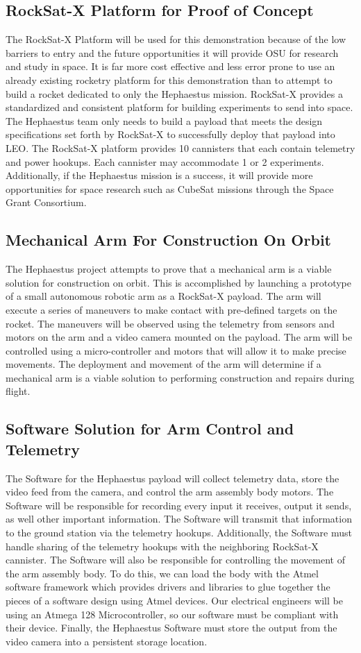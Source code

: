 \documentclass[letterpaper,10pt]{article}
\begin{document}
\subsection{RockSat-X Platform for Proof of Concept}
The RockSat-X Platform will be used for this demonstration because of the low barriers to entry and
the future opportunities it will provide OSU for research and study in space.
It is far more cost effective and less error prone to use an already existing rocketry platform for
this demonstration than to attempt to build a rocket dedicated to only the Hephaestus mission.
RockSat-X provides a standardized and consistent platform for building experiments to send into space.
The Hephaestus team only needs to build a payload that meets the design specifications set forth by
RockSat-X to successfully deploy that payload into LEO.
The RockSat-X platform provides 10 cannisters that each contain telemetry and power hookups.
Each cannister may accommodate 1 or 2 experiments.
Additionally, if the Hephaestus mission is a success, it will provide more opportunities for space
research such as CubeSat missions through the Space Grant Consortium.
\subsection{Mechanical Arm For Construction On Orbit}
The Hephaestus project attempts to prove that a mechanical arm is a viable solution for construction on orbit.
This is accomplished by launching a prototype of a small autonomous robotic arm as a RockSat-X payload.
The arm will execute a series of maneuvers to make contact with pre-defined targets on the rocket.
The maneuvers will be observed using the telemetry from sensors and motors on the arm and a video
camera mounted on the payload.
The arm will be controlled using a micro-controller and motors that will allow it to make precise movements.
The deployment and movement of the arm will determine if a mechanical arm is a viable solution to
performing construction and repairs during flight.
\subsection{Software Solution for Arm Control and Telemetry}
The Software for the Hephaestus payload will collect telemetry data, store the video feed from the
camera, and control the arm assembly body motors.
The Software will be responsible for recording every input it receives, output it sends, as well other
important information. The Software will transmit that information to the ground station via the
telemetry hookups.
Additionally, the Software must handle sharing of the telemetry hookups with the neighboring RockSat-X
cannister. 
The Software will also be responsible for controlling the movement of the arm assembly body. To do this, we can load the body with the Atmel software framework which provides drivers and libraries to glue together the pieces of a software design using Atmel devices. Our electrical engineers will be using an Atmega 128 Microcontroller, so our software must be compliant with their device.
Finally, the Hephaestus Software must store the output from the video camera into a persistent storage
location.
\end{document}
